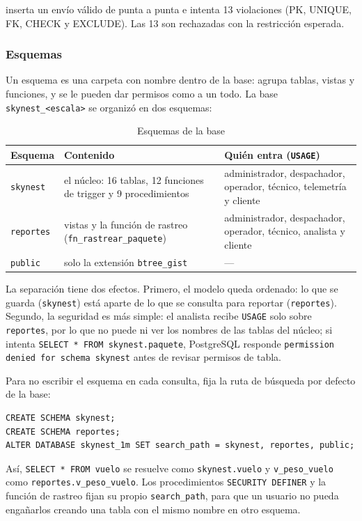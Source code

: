  inserta un envío válido de punta a punta e intenta 13 violaciones (PK, UNIQUE, FK, CHECK y EXCLUDE). Las 13 son rechazadas con la restricción esperada.

\subsubsection{Esquemas}
\label{sec:esquemas}

Un esquema es una carpeta con nombre dentro de la base: agrupa tablas, vistas y funciones, y se le pueden dar permisos como a un todo. La base \texttt{skynest\_<escala>} se organizó en dos esquemas:

\begin{table}[H]
\centering\small
\caption{Esquemas de la base}
\label{tab:esquemas}
\begin{tabular}{l>{\raggedright\arraybackslash}p{6.4cm}>{\raggedright\arraybackslash}p{5cm}}
\toprule
Esquema & Contenido & Quién entra (\texttt{USAGE}) \\
\midrule
\texttt{skynest} & el núcleo: 16 tablas, 12 funciones de trigger y 9 procedimientos & administrador, despachador, operador, técnico, telemetría y cliente \\
\texttt{reportes} & 9 vistas y la función de rastreo (\texttt{fn\_rastrear\_paquete}) & administrador, despachador, operador, técnico, analista y cliente \\
\texttt{public} & solo la extensión \texttt{btree\_gist} & --- \\
\bottomrule
\end{tabular}
\end{table}

La separación tiene dos efectos. Primero, el modelo queda ordenado: lo que se guarda (\texttt{skynest}) está aparte de lo que se consulta para reportar (\texttt{reportes}). Segundo, la seguridad es más simple: el analista recibe \texttt{USAGE} solo sobre \texttt{reportes}, por lo que no puede ni ver los nombres de las tablas del núcleo; si intenta \texttt{SELECT * FROM skynest.paquete}, PostgreSQL responde \texttt{permission denied for schema skynest} antes de revisar permisos de tabla.

Para no escribir el esquema en cada consulta,  fija la ruta de búsqueda por defecto de la base:
\begin{lstlisting}[style=sql]
CREATE SCHEMA skynest;
CREATE SCHEMA reportes;
ALTER DATABASE skynest_1m SET search_path = skynest, reportes, public;
\end{lstlisting}
Así, \texttt{SELECT * FROM vuelo} se resuelve como \texttt{skynest.vuelo} y \texttt{v\_peso\_vuelo} como \texttt{reportes.v\_peso\_vuelo}. Los procedimientos \texttt{SECURITY DEFINER} y la función de rastreo fijan su propio \texttt{search\_path}, para que un usuario no pueda engañarlos creando una tabla con el mismo nombre en otro esquema.

